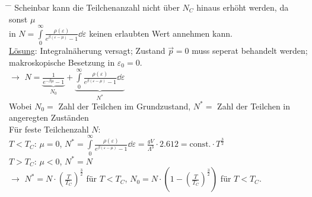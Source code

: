 \begin{tabbing}
\hspace{4em} \= \hspace{4em} \= \kill
Scheinbar kann die Teilchenanzahl nicht über $N_C$ hinaus erhöht werden, da sonst $\mu$\\ in $N = \int\limits_0^{\infty} \frac{\rho(\varepsilon)}{e^{\beta(\varepsilon-\mu)}-1} \dd{\varepsilon}$ keinen erlaubten Wert annehmen kann.\\
\underline{Lösung}: Integralnäherung versagt; Zustand $\vec{p} = 0$ muss seperat behandelt werden;\\ makroskopische Besetzung in $\varepsilon_0 = 0$.\\
$\rightarrow$\> $N = \underbrace{\frac{1}{e^{-\beta\mu} - 1}}_{N_0} + \underbrace{\int\limits_0^{\infty}\frac{\rho(\varepsilon)}{e^{\beta(\varepsilon - \mu)} - 1} \dd{\varepsilon}}_{N^{*}}$\\
Wobei $N_0 = $ Zahl der Teilchen im Grundzustand, $N^{*} = $ Zahl der Teilchen in angeregten Zuständen\\
Für feste Teilchenzahl $N$:\\
\> $T < T_C$: $\mu = 0$, $N^{*} = \int\limits_0^{\infty}\frac{\rho(\varepsilon)}{e^{\beta(\varepsilon - \mu)} - 1} \dd{\varepsilon} = \frac{g V}{\Lambda^3}\cdot 2.612 = \text{const.}\cdot T^{\frac{3}{2}}$\\
\> $T > T_C$: $\mu < 0$, $N^{*} = N$\\
$\rightarrow$\> $N^{*} = N\cdot \left(\frac{T}{T_C}\right)^{\frac{3}{2}}$ für $T < T_C$, $N_0 = N \cdot \left(1-\left(\frac{T}{T_C}\right)^{\frac{3}{2}}\right)$ für $T < T_C$.\\
\end{tabbing}
\begin{figure}[H]
  \centering

\end{figure}
